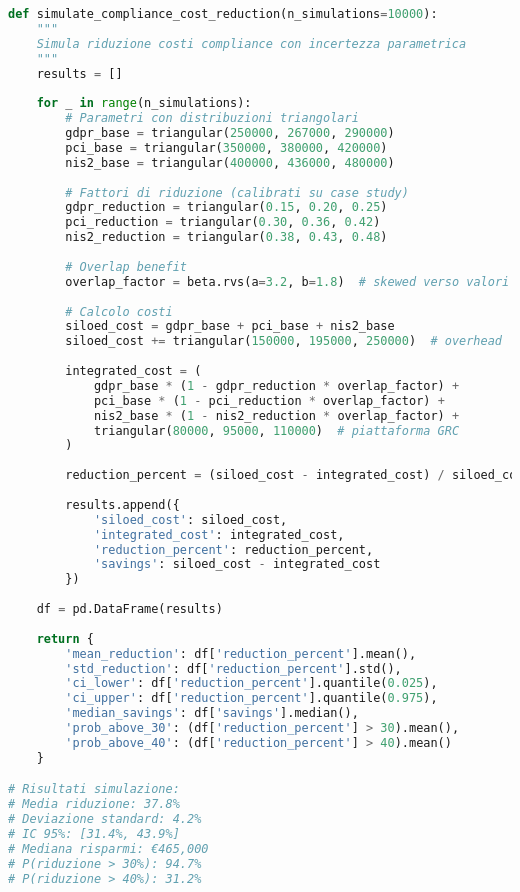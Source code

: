 \begin{lstlisting}[language=Python, caption=Simulazione riduzione costi compliance]
def simulate_compliance_cost_reduction(n_simulations=10000):
    """
    Simula riduzione costi compliance con incertezza parametrica
    """
    results = []
    
    for _ in range(n_simulations):
        # Parametri con distribuzioni triangolari
        gdpr_base = triangular(250000, 267000, 290000)
        pci_base = triangular(350000, 380000, 420000)
        nis2_base = triangular(400000, 436000, 480000)
        
        # Fattori di riduzione (calibrati su case study)
        gdpr_reduction = triangular(0.15, 0.20, 0.25)
        pci_reduction = triangular(0.30, 0.36, 0.42)
        nis2_reduction = triangular(0.38, 0.43, 0.48)
        
        # Overlap benefit
        overlap_factor = beta.rvs(a=3.2, b=1.8)  # skewed verso valori alti
        
        # Calcolo costi
        siloed_cost = gdpr_base + pci_base + nis2_base
        siloed_cost += triangular(150000, 195000, 250000)  # overhead
        
        integrated_cost = (
            gdpr_base * (1 - gdpr_reduction * overlap_factor) +
            pci_base * (1 - pci_reduction * overlap_factor) +
            nis2_base * (1 - nis2_reduction * overlap_factor) +
            triangular(80000, 95000, 110000)  # piattaforma GRC
        )
        
        reduction_percent = (siloed_cost - integrated_cost) / siloed_cost * 100
        
        results.append({
            'siloed_cost': siloed_cost,
            'integrated_cost': integrated_cost,
            'reduction_percent': reduction_percent,
            'savings': siloed_cost - integrated_cost
        })
        
    df = pd.DataFrame(results)
    
    return {
        'mean_reduction': df['reduction_percent'].mean(),
        'std_reduction': df['reduction_percent'].std(),
        'ci_lower': df['reduction_percent'].quantile(0.025),
        'ci_upper': df['reduction_percent'].quantile(0.975),
        'median_savings': df['savings'].median(),
        'prob_above_30': (df['reduction_percent'] > 30).mean(),
        'prob_above_40': (df['reduction_percent'] > 40).mean()
    }

# Risultati simulazione:
# Media riduzione: 37.8%
# Deviazione standard: 4.2%
# IC 95%: [31.4%, 43.9%]
# Mediana risparmi: €465,000
# P(riduzione > 30%): 94.7%
# P(riduzione > 40%): 31.2%
\end{lstlisting}

